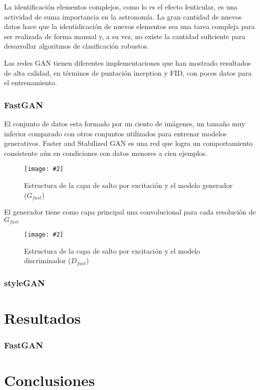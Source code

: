 \documentclass[letterpaper,12pt,oneside]{book}
\newcommand{\figura}[4]{
          \begin{figure}[H]
            \centering
            \texttt{[image: \#2]}
            \caption{#3}
            \label{#4}
          \end{figure}
                            }
\begin{document}
                La identificación elementos complejos, como lo es el efecto lenticular, es una actividad de suma importancia en la astronomía. La gran cantidad de nuevos datos hace que la identidicación de nuevos elementos sea una tarea compleja para ser realizada de forma manual y, a su vez, no existe la cantidad suficiente para desarrollar algoritmos de clasificación robustos. 

                Las redes GAN tienen diferentes implementaciones que han mostrado resultados de alta calidad, en términos de puntación inception y FID, con pocos datos para el entrenamiento. 
                
                \subsection{FastGAN}
                    El conjunto de datos esta formado por un ciento de imágenes, un tamaño muy inferior comparado con otros conjuntos utilizados para entrenar modelos generativos. {Faster and Stabilized GAN} es una red que logra un comportamiento consistente aún en condiciones con datos menores a cien ejemplos. 

                    \figura{0.35}{Imagenes/Resultados/fastgan.png}{Estructura de la capa de salto por excitación y el modelo generador ($G_{fast}$)}{fig:fastgen}
                    
                    El generador tiene como capa principal una convolucional para cada resolución de $G_{fast}$

                    \figura{1}{Imagenes/Resultados/fastgan.png}{Estructura de la capa de salto por excitación y el modelo discriminador ($D_{fast}$)}{fig:fastdis}

                  

                \subsection{styleGAN}

                
            \chapter{Resultados}
                \subsection{FastGAN}
            \chapter{Conclusiones}
        
\end{document}
